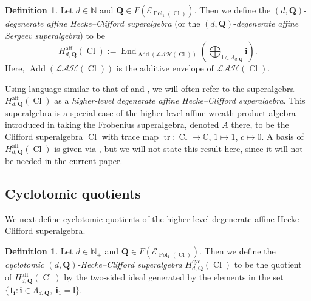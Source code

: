 \documentclass[11pt]{amsart}
\newcommand\go{\mathsf{I}}              %
\theoremstyle{definition}
\newtheorem{defn}[theo]{Definition}
\numberwithin{equation}{section}
\begin{document}
\begin{defn} 
Let $ d \in \mathbb{N} $ and $ \mathbf{Q} \in F(\mathcal{E}_{\operatorname{Pol}_{1}(\operatorname{Cl})}) $. Then we define the $ (d,\mathbf{Q}) $-\emph{degenerate affine Hecke--Clifford superalgebra} (or the $ (d,\mathbf{Q}) $-\emph{degenerate affine Sergeev superalgebra}) to be 
\begin{equation} \label{higher_Clifford_Hecke_def}
H_{d,\mathbf{Q}}^{\operatorname{aff}}(\operatorname{Cl}) := \operatorname{End}_{\operatorname{Add}(\mathcal{LAH}(\operatorname{Cl}))}\left(\bigoplus_{\mathbf{i} \in \Lambda_{d,\mathbf{Q}}} \mathbf{i}\right).
\end{equation}
Here, $ \operatorname{Add}(\mathcal{LAH}(\operatorname{Cl})) $ is the additive envelope of $ \mathcal{LAH}(\operatorname{Cl}) $. 
\end{defn}


Using language similar to that of \cite{Maksimau-Stroppel} and \cite{Moran}, we will often refer to the superalgebra $ H_{d,\mathbf{Q}}^{\operatorname{aff}}(\operatorname{Cl}) $ as a \emph{higher-level degenerate affine Hecke--Clifford superalgebra}. This superalgebra is a special case of the higher-level affine wreath product algebra introduced in \cite[Def.~5.5]{Moran} taking the Frobenius superalgebra, denoted \(A\) there, to be the Clifford superalgebra $ \operatorname{Cl} $ with trace map $ \operatorname{tr} \colon \operatorname{Cl} \rightarrow \mathbb{C} $, $ 1 \mapsto 1 $, $ c \mapsto 0 $. A basis of $ H_{d,\mathbf{Q}}^{\operatorname{aff}}(\operatorname{Cl}) $ is given via \cite[Thm.~5.18]{Moran}, but we will not state this result here, since it will not be needed in the current paper. 

\subsection{Cyclotomic quotients}

We next define cyclotomic quotients of the higher-level degenerate affine Hecke--Clifford superalgebra.


\begin{defn} \label{spin_cyclotomic_quotient_Clifford}
Let $ d \in \mathbb{N}_{+} $ and $ \mathbf{Q} \in F(\mathcal{E}_{\operatorname{Pol}_{1}(\operatorname{Cl})}) $. Then we define the \emph{cyclotomic $ (d,\mathbf{Q}) $-Hecke--Clifford superalgebra} $ H_{d,\mathbf{Q}}^{\operatorname{cyc}}(\operatorname{Cl}) $ to be the quotient of $ H_{d,\mathbf{Q}}^{\operatorname{aff}}(\operatorname{Cl}) $ by the two-sided ideal generated by the elements in the set $ \{1_{\mathbf{i}} : \mathbf{i} \in \Lambda_{d,\mathbf{Q}}, \ \mathbf{i}_{1} = \go \} $.
\end{defn}
\end{document}
